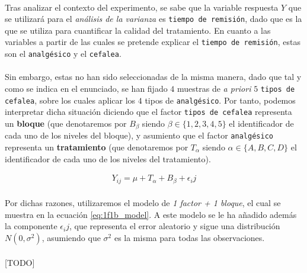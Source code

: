 \documentclass[11pt]{article}
\begin{document}
      \paragraph{}
      Tras analizar el contexto del experimento, se sabe que la variable respuesta $Y$ que se utilizará para el \emph{análisis de la varianza} es \texttt{tiempo de remisión}, dado que es la que se utiliza para cuantificar la calidad del tratamiento. En cuanto a las variables a partir de las cuales se pretende explicar el \texttt{tiempo de remisión}, estas son el \texttt{analgésico} y el \texttt{cefalea}.

      \paragraph{}
      Sin embargo, estas no han sido seleccionadas de la misma manera, dado que tal y como se indica en el enunciado, se han fijado $4$ muestras de \emph{a priori} $5$ \texttt{tipos de cefalea}, sobre los cuales aplicar los $4$ tipos de \texttt{analgésico}. Por tanto, podemos interpretar dicha situación diciendo que el factor \texttt{tipos de cefalea} representa un \textbf{bloque} (que denotaremos por $B_\beta$ siendo $\beta \in \{1,2,3,4,5\}$ el identificador de cada uno de los niveles del bloque), y asumiento que el factor \texttt{analgésico} representa un \textbf{tratamiento} (que denotaremos por $T_\alpha $ siendo $\alpha \in \{A, B, C, D\}$ el identificador de cada uno de los niveles del tratamiento).

      \begin{align}
      \label{eq:1f1b_model}
        Y_{ij} = \mu + T_\alpha + B_\beta + \epsilon_ij
      \end{align}

      \paragraph{}
      Por dichas razones, utilizaremos el modelo de \emph{1 factor + 1 bloque}, el cual se muestra en la ecuación \eqref{eq:1f1b_model}. A este modelo se le ha añadido además la componente $\epsilon_ij$, que representa el error aleatorio y sigue una distribución $N(0, \sigma^2)$, asumiendo que $\sigma^2$ es la misma para todas las observaciones.

      \paragraph{}
      [TODO]
\end{document}
